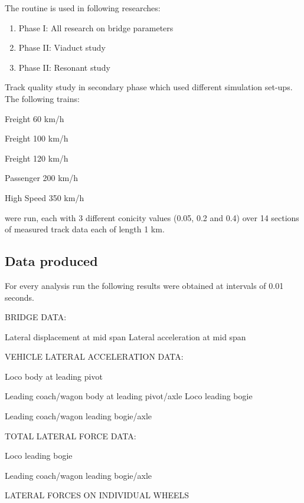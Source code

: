 \begin{appendices}
\vspace*{\baselineskip}
The routine is used in following researches:
\begin{enumerate}
    \item Phase I: All research on bridge parameters
    \item Phase II: Viaduct study
    \item Phase II: Resonant study
\end{enumerate}

\vspace*{\baselineskip}

Track quality study in secondary phase which used different simulation set-ups. The following trains:

Freight 60 km/h 

Freight 100 km/h 

Freight 120 km/h 

Passenger 200 km/h 

High Speed 350 km/h

were run, each with 3 different conicity values (0.05, 0.2 and 0.4) over 14 sections of measured track data each of length 1 km.


\subsection{Data produced}

For every analysis run the following results were obtained at intervals of 0.01 seconds.

BRIDGE DATA:

Lateral displacement at mid span Lateral acceleration at mid span

\vspace*{\baselineskip}

VEHICLE LATERAL ACCELERATION DATA:

Loco body at leading pivot

Leading coach/wagon body at leading pivot/axle Loco leading bogie

Leading coach/wagon leading bogie/axle

\vspace*{\baselineskip}

TOTAL LATERAL FORCE DATA:

Loco leading bogie

Leading coach/wagon leading bogie/axle

\vspace*{\baselineskip}

LATERAL FORCES ON INDIVIDUAL WHEELS


\end{appendices}
